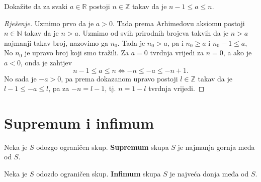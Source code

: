 \begin{exercise}
Dokažite da za svaki $a\in \mathbb{R}$ postoji $n\in \mathbb{Z}$ takav da je $n-1\leq a\leq n$.
\end{exercise}
\begin{proof}[Rješenje]
Uzmimo prvo da je $a>0$. Tada prema Arhimedovu aksiomu postoji $n\in \mathbb{N}$ takav da je $n>a$. Uzmimo od svih prirodnih brojeva takvih da je $n>a$ najmanji takav broj, nazovimo ga $n_0$. Tada je $n_0>a$, pa i $n_0\geq a$ i $n_0-1\leq a$, No $n_0$ je upravo broj koji smo tražili. Za $a=0$ tvrdnja vrijedi za $n=0$, a ako je $a<0$, onda je zahtjev 
$$n-1\leq a\leq n
\Longleftrightarrow -n\leq -a\leq -n+1.$$ 
No sada je $-a>0$, pa prema dokazanom upravo postoji $l\in \mathbb{Z}$ takav da je $l-1\leq -a\leq l$, pa za $-n=l-1$, tj. $n=1-l$ tvrdnja vrijedi.
\end{proof}

\section{Supremum i infimum}

\begin{definition}
Neka je $S$ odozgo ograničen skup. \textbf{Supremum} skupa $S$ je najmanja gornja međa od $S$.
\end{definition}

\begin{definition}
Neka je $S$ odozdo ograničen skup. \textbf{Infimum} skupa $S$ je najveća donja međa od $S$.
\end{definition}

